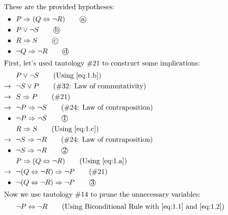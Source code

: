 \documentclass[12pt]{article}
\begin{document}
\begin{align*}
  \intertext{These are the provided hypotheses:}
    \bullet\ \ & P \Rightarrow (Q \Leftrightarrow \neg R)                  \tag*{\textcircled{a}} \label{eq:1.a} \\
    \bullet\ \ & P \vee \neg S                                             \tag*{\textcircled{b}} \label{eq:1.b} \\
    \bullet\ \ & R \Rightarrow S                                           \tag*{\textcircled{c}} \label{eq:1.c} \\
    \bullet\ \ & \neg Q \Rightarrow \neg R                                 \tag*{\textcircled{d}} \label{eq:1.d} \\
  \intertext{First, let's used tautology \#21 to construct some implications:}
    & P \lor \neg S                                                       \tag{Using\ \ref{eq:1.b}} \\
    \rightarrow\ \ & \neg S \lor P                                        \tag{\#32: Law of commutativity} \\
    \rightarrow\ \ & S \Rightarrow P                                      \tag{\#21} \\
    \rightarrow\ \ & \neg P \Rightarrow \neg S                            \tag{\#24: Law of contraposition} \\
    \bullet\ \ & \neg P \Rightarrow \neg S                                \tag*{\textcircled{1}} \label{eq:1.1} \\
    & R \Rightarrow S                                                     \tag{Using\ \ref{eq:1.c}} \\
    \rightarrow\ \ & \neg S \Rightarrow \neg R                            \tag{\#24: Law of contraposition} \\
    \bullet \ \ & \neg S \Rightarrow \neg R                               \tag*{\textcircled{2}} \label{eq:1.2} \\
    & P \Rightarrow (Q \Leftrightarrow \neg R)                            \tag{Using\ \ref{eq:1.a}} \\
    \rightarrow\ \ & \neg (Q \Leftrightarrow \neg R) \Rightarrow \neg P   \tag{\#21} \\
    \bullet\ \ & \neg (Q \Leftrightarrow \neg R) \Rightarrow \neg P       \tag*{\textcircled{3}} \label{eq:1.3} \\
  \intertext{Now we use tautology \#14 to prune the unnecessary variables:}
    & \neg P \Leftrightarrow \neg R                                       \tag{Using Biconditional Rule with\ \ref{eq:1.1} and\ \ref{eq:1.2}}\\

\end{align*}
\end{document}
